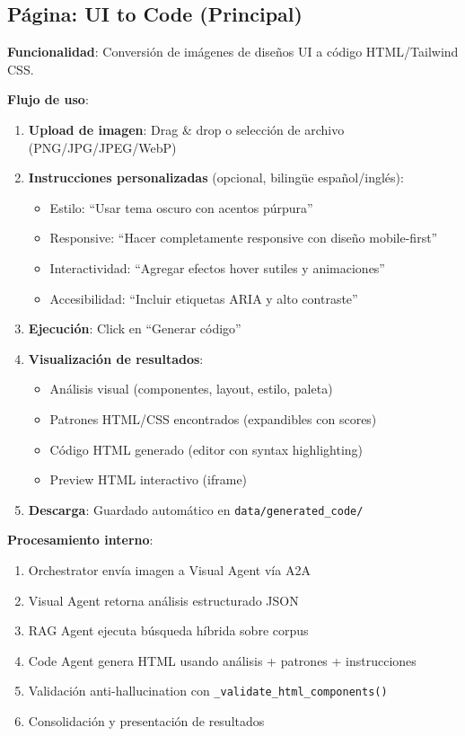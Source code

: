 \documentclass[12pt,a4paper]{article}
\begin{document}
\subsection{Página: UI to Code (Principal)}

\textbf{Funcionalidad}: Conversión de imágenes de diseños UI a código HTML/Tailwind CSS.

\textbf{Flujo de uso}:
\begin{enumerate}
    \item \textbf{Upload de imagen}: Drag \& drop o selección de archivo (PNG/JPG/JPEG/WebP)
    \item \textbf{Instrucciones personalizadas} (opcional, bilingüe español/inglés):
    \begin{itemize}
        \item Estilo: ``Usar tema oscuro con acentos púrpura''
        \item Responsive: ``Hacer completamente responsive con diseño mobile-first''
        \item Interactividad: ``Agregar efectos hover sutiles y animaciones''
        \item Accesibilidad: ``Incluir etiquetas ARIA y alto contraste''
    \end{itemize}
    \item \textbf{Ejecución}: Click en ``Generar código''
    \item \textbf{Visualización de resultados}:
    \begin{itemize}
        \item Análisis visual (componentes, layout, estilo, paleta)
        \item Patrones HTML/CSS encontrados (expandibles con scores)
        \item Código HTML generado (editor con syntax highlighting)
        \item Preview HTML interactivo (iframe)
    \end{itemize}
    \item \textbf{Descarga}: Guardado automático en \texttt{data/generated\_code/}
\end{enumerate}

\textbf{Procesamiento interno}:
\begin{enumerate}
    \item Orchestrator envía imagen a Visual Agent vía A2A
    \item Visual Agent retorna análisis estructurado JSON
    \item RAG Agent ejecuta búsqueda híbrida sobre corpus
    \item Code Agent genera HTML usando análisis + patrones + instrucciones
    \item Validación anti-hallucination con \texttt{\_validate\_html\_components()}
    \item Consolidación y presentación de resultados
\end{enumerate}
\end{document}
